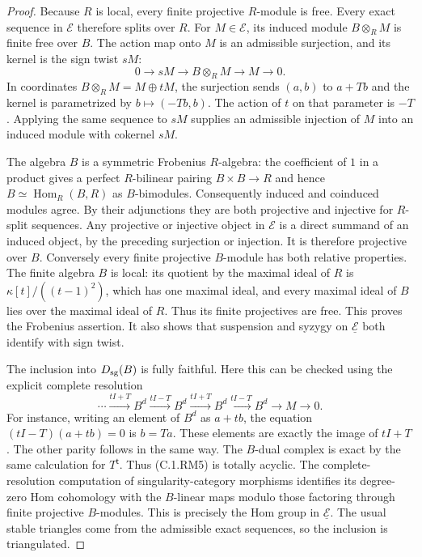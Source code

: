 \begin{proof}
Because $R$ is local, every finite projective
$R$-module is free.  Every exact sequence in
$\mathcal E$ therefore splits over $R$.
For $M\in\mathcal E$, its induced module
$B\otimes_R M$ is finite free over $B$.
The action map onto $M$ is an admissible
surjection, and its kernel is the sign twist
$sM$:
\[
 0\longrightarrow sM\longrightarrow B\otimes_R M
       \longrightarrow M\longrightarrow0.           \tag{C.1.RM4}
\]
In coordinates $B\otimes_R M=M\oplus tM$, the
surjection sends $(a,b)$ to $a+Tb$ and the
kernel is parametrized by $b\mapsto(-Tb,b)$.
The action of $t$ on that parameter is $-T$.
Applying the same sequence to $sM$ supplies
an admissible injection of $M$ into an induced
module with cokernel $sM$.

The algebra $B$ is a symmetric Frobenius
$R$-algebra: the coefficient of $1$ in a
product gives a perfect $R$-bilinear pairing
$B\times B\to R$ and hence
$B\simeq\operatorname{Hom}_R(B,R)$ as
$B$-bimodules.
Consequently induced and coinduced modules
agree.  By their adjunctions they are both
projective and injective for $R$-split
sequences.  Any projective or injective
object in $\mathcal E$ is a direct summand
of an induced object, by the preceding
surjection or injection.
It is therefore projective over $B$.
Conversely every finite projective $B$-module
has both relative properties.
The finite algebra $B$ is local: its
quotient by the maximal ideal of $R$ is
$\kappa[t]/((t-1)^2)$, which has one maximal
ideal, and every maximal ideal of $B$
lies over the maximal ideal of $R$.
Thus its finite projectives are free.
This proves the Frobenius assertion.
It also shows that suspension and syzygy
on $\underline{\mathcal E}$ both identify
with sign twist.

The inclusion into $D_{\rm sg}(B)$ is fully
faithful.  Here this can be checked using
the explicit complete resolution
\[
 \cdots\xrightarrow{tI+T}B^d
 \xrightarrow{tI-T}B^d
 \xrightarrow{tI+T}B^d
 \xrightarrow{tI-T}B^d\longrightarrow M\longrightarrow0.
                                                               \tag{C.1.RM5}
\]
For instance, writing an element of $B^d$
as $a+tb$, the equation $(tI-T)(a+tb)=0$
is $b=Ta$.  These elements are exactly
the image of $tI+T$.
The other parity follows in the same way.
The $B$-dual complex is exact by the same
calculation for $T^{\mathsf t}$.
Thus (C.1.RM5) is totally acyclic.
The complete-resolution computation of
singularity-category morphisms
\cite[Lemma B.6]{C-BurkeWalker2012}
identifies its degree-zero Hom cohomology
with the $B$-linear maps modulo those
factoring through finite projective
$B$-modules.  This is precisely the Hom
group in $\underline{\mathcal E}$.
The usual stable triangles come from
the admissible exact sequences, so
the inclusion is triangulated.


\end{proof}
